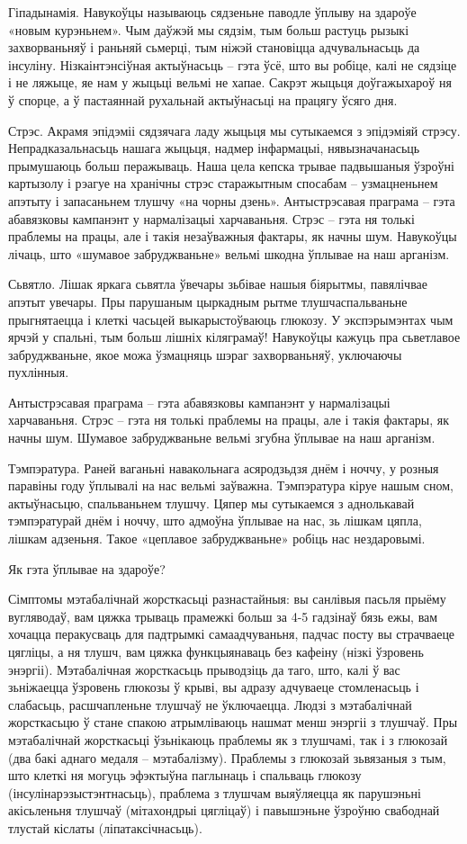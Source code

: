 Гіпадынамія.
Навукоўцы называюць сядзеньне паводле ўплыву на здароўе «новым курэньнем». Чым даўжэй мы сядзім, тым больш растуць рызыкі захворваньняў і раньняй сьмерці, тым ніжэй становіцца адчувальнасьць да інсуліну. Нізкаінтэнсіўная актыўнасьць – гэта ўсё, што вы робіце, калі не сядзіце і не ляжыце, яе нам у жыцьці вельмі не хапае. Сакрэт жыцьця доўгажыхароў ня ў спорце, а ў пастаяннай рухальнай актыўнасьці на працягу ўсяго дня.

Стрэс.
Акрамя эпідэміі сядзячага ладу жыцьця мы сутыкаемся з эпідэміяй стрэсу. Непрадказальнасьць нашага жыцьця, надмер інфармацыі, нявызначанасьць прымушаюць больш перажываць. Наша цела кепска трывае падвышаныя ўзроўні картызолу і рэагуе на хранічны стрэс старажытным спосабам – узмацненьнем апэтыту і запасаньнем тлушчу «на чорны дзень». Антыстрэсавая праграма – гэта абавязковы кампанэнт у нармалізацыі харчаваньня. Стрэс – гэта ня толькі праблемы на працы, але і такія незаўважныя фактары, як начны шум. Навукоўцы лічаць, што «шумавое забруджваньне» вельмі шкодна ўплывае на наш арганізм.

Сьвятло.
Лішак яркага сьвятла ўвечары зьбівае нашыя біярытмы, павялічвае апэтыт увечары. Пры парушаным цыркадным рытме тлушчаспальваньне прыгнятаецца і клеткі часьцей выкарыстоўваюць глюкозу. У экспэрымэнтах чым ярчэй у спальні, тым больш лішніх кіляграмаў! Навукоўцы кажуць пра сьветлавое забруджваньне, якое можа ўзмацняць шэраг захворваньняў, уключаючы пухлінныя.

Антыстрэсавая праграма – гэта абавязковы кампанэнт у нармалізацыі харчаваньня. Стрэс – гэта ня толькі праблемы на працы, але і такія фактары, як начны шум. Шумавое забруджваньне вельмі згубна ўплывае на наш арганізм.

Тэмпэратура.
Раней ваганьні навакольнага асяродзьдзя днём і ноччу, у розныя паравіны году ўплывалі на нас вельмі заўважна. Тэмпэратура кіруе нашым сном, актыўнасьцю, спальваньнем тлушчу. Цяпер мы сутыкаемся з аднолькавай тэмпэратурай днём і ноччу, што адмоўна ўплывае на нас, зь лішкам цяпла, лішкам адзеньня. Такое «цеплавое забруджваньне» робіць нас нездаровымі.

Як гэта ўплывае на здароўе?

Сімптомы мэтабалічнай жорсткасьці разнастайныя: вы санлівыя пасьля прыёму вугляводаў, вам цяжка трываць прамежкі больш за 4-5 гадзінаў бязь ежы, вам хочацца перакусваць для падтрымкі самаадчуваньня, падчас посту вы страчваеце цягліцы, а ня тлушч, вам цяжка функцыянаваць без кафеіну (нізкі ўзровень энэргіі). Мэтабалічная жорсткасьць прыводзіць да таго, што, калі ў вас зьніжаецца ўзровень глюкозы ў крыві, вы адразу адчуваеце стомленасьць і слабасьць, расшчапленьне тлушчаў не ўключаецца. Людзі з мэтабалічнай жорсткасьцю ў стане спакою атрымліваюць нашмат менш энэргіі з тлушчаў.
Пры мэтабалічнай жорсткасьці ўзьнікаюць праблемы як з тлушчамі, так і з глюкозай (два бакі аднаго медаля – мэтабалізму). Праблемы з глюкозай зьвязаныя з тым, што клеткі ня могуць эфэктыўна паглынаць і спальваць глюкозу (інсулінарэзыстэнтнасьць), праблема з тлушчам выяўляецца як парушэньні акісьленьня тлушчаў (мітахондрыі цягліцаў) і павышэньне ўзроўню свабоднай тлустай кіслаты (ліпатаксічнасьць).

